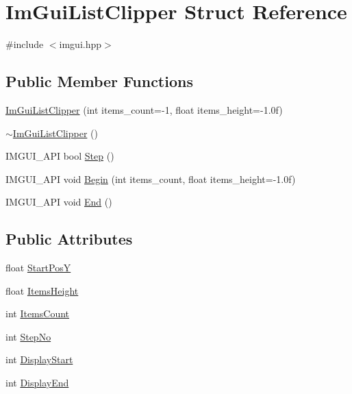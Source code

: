 \hypertarget{struct_im_gui_list_clipper}{}\section{Im\+Gui\+List\+Clipper Struct Reference}
\label{struct_im_gui_list_clipper}


{\ttfamily \#include $<$imgui.\+hpp$>$}

\subsection*{Public Member Functions}
\begin{DoxyCompactItemize}
\item 
\hyperlink{struct_im_gui_list_clipper_a0dc870fa31a56d3ace7625450f42937a}{Im\+Gui\+List\+Clipper} (int items\+\_\+count=-\/1, float items\+\_\+height=-\/1.\+0f)
\item 
\hyperlink{struct_im_gui_list_clipper_ada915f0ae4446df73c1a2372bde65293}{$\sim$\+Im\+Gui\+List\+Clipper} ()
\item 
I\+M\+G\+U\+I\+\_\+\+A\+PI bool \hyperlink{struct_im_gui_list_clipper_ac3e115812c3c4e5a39578a7aa955379a}{Step} ()
\item 
I\+M\+G\+U\+I\+\_\+\+A\+PI void \hyperlink{struct_im_gui_list_clipper_a746fbd724a41dbe88fef4875a2b1e9c7}{Begin} (int items\+\_\+count, float items\+\_\+height=-\/1.\+0f)
\item 
I\+M\+G\+U\+I\+\_\+\+A\+PI void \hyperlink{struct_im_gui_list_clipper_a3e6aec0db317985319a78513fc2c8068}{End} ()
\end{DoxyCompactItemize}
\subsection*{Public Attributes}
\begin{DoxyCompactItemize}
\item 
float \hyperlink{struct_im_gui_list_clipper_affee91b338520cd4bd59b5b680dcb5ae}{Start\+PosY}
\item 
float \hyperlink{struct_im_gui_list_clipper_a19762cb78ff0adccb414027c25678a60}{Items\+Height}
\item 
int \hyperlink{struct_im_gui_list_clipper_a4e2b4e8efe10615d04ad2aeea467f522}{Items\+Count}
\item 
int \hyperlink{struct_im_gui_list_clipper_a8fe78f0368e16425c33fd35ca45d1912}{Step\+No}
\item 
int \hyperlink{struct_im_gui_list_clipper_a9d096e06e5633fd77a8a209c00fe454a}{Display\+Start}
\item 
int \hyperlink{struct_im_gui_list_clipper_aa49e30d04ad8f8b95fbaa62dfbb4ea3e}{Display\+End}
\end{DoxyCompactItemize}


